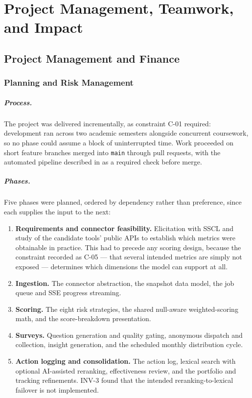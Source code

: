 \chapter{Project Management, Teamwork, and Impact}
\label{ch:management}

\section{Project Management and Finance}
\label{sec:management}

\subsection{Planning and Risk Management}
\label{subsec:planning}

\paragraph{Process.} The project was delivered incrementally, as constraint C-01
required: development ran across two academic semesters alongside concurrent
coursework, so no phase could assume a block of uninterrupted time. Work
proceeded on short feature branches merged into \texttt{main} through pull
requests, with the automated pipeline described in  as a
required check before merge.

\paragraph{Phases.} Five phases were planned, ordered by dependency rather than
preference, since each supplies the input to the next:

\begin{enumerate}
  \item \textbf{Requirements and connector feasibility.} Elicitation with SSCL
  and study of the candidate tools' public APIs to establish which metrics were
  obtainable in practice. This had to precede any scoring design, because the
  constraint recorded as C-05 --- that several intended metrics are simply not
  exposed --- determines which dimensions the model can support at all.
  \item \textbf{Ingestion.} The connector abstraction, the snapshot data model,
  the job queue and SSE progress streaming.
  \item \textbf{Scoring.} The eight risk strategies, the shared null-aware
  weighted-scoring math, and the score-breakdown presentation.
  \item \textbf{Surveys.} Question generation and quality gating, anonymous
  dispatch and collection, insight generation, and the scheduled monthly
  distribution cycle.
  \item \textbf{Action logging and consolidation.} The action log, lexical
  search with optional AI-assisted reranking, effectiveness review, and the
  portfolio and tracking refinements. INV-3 found that the intended
  reranking-to-lexical failover is not implemented.
\end{enumerate}

